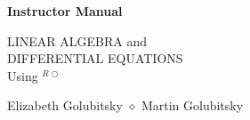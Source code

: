 \newcommand{\trademark}{{R\!\!\!\!\!\bigcirc}}

%
 
 
 
 



 

%


\makeindex


 



\setcounter{page}{0}

\vspace*{1.0in} 

\Huge

\begin{center}

{\bf Instructor Manual}

\vspace{1.5in} 

\huge

LINEAR ALGEBRA and \\
DIFFERENTIAL EQUATIONS \\
Using \protect{\Matlabp}$^\trademark$
 
\vspace{2.0in}

 
Elizabeth Golubitsky \quad $\diamond$ \quad Martin Golubitsky
\end{center}
\normalsize

\tableofcontents






















\printindex

\setcounter{page}{1}























